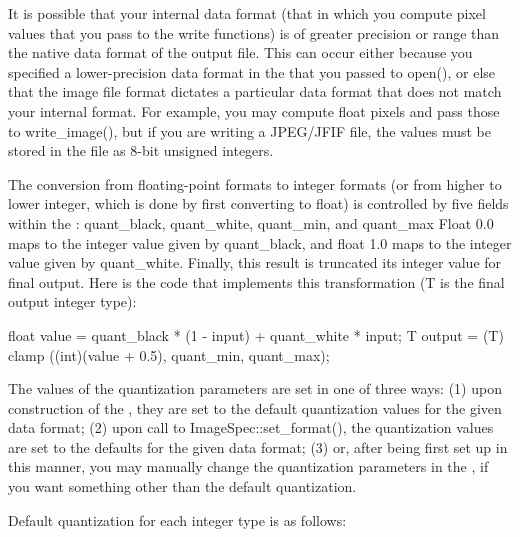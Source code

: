 It is possible that your internal data format (that in which you compute
pixel values that you pass to the {\cf write} functions) is of greater
precision or range than the native data format of the output file.  This
can occur either because you specified a lower-precision data format in
the \ImageSpec that you passed to {\cf open()}, or else that the
image file format dictates a particular data format that does not match
your internal format.  For example, you may compute {\cf float} pixels
and pass those to {\cf write_image()}, but if you are writing a
JPEG/JFIF file, the values must be stored in the file as 8-bit unsigned
integers.

The conversion from floating-point formats to integer formats (or from
higher to lower integer, which is done by first converting to float) is
controlled by five fields within the \ImageSpec: {\cf
  quant_black}, {\cf quant_white}, {\cf quant_min}, and {\cf quant_max}
Float 0.0 maps to the integer value given by {\cf quant_black}, and
float 1.0 maps to the integer value given by {\cf quant_white}. Finally,
this result is truncated its integer value for final output.  Here is
the code that implements this transformation ({\cf T} is the final
output integer type):

\begin{code}
        float value = quant_black * (1 - input) + quant_white * input;
        T output = (T) clamp ((int)(value + 0.5), quant_min, quant_max);
\end{code}

The values of the quantization parameters are set in one of three ways:
(1) upon construction of the \ImageSpec, they are set to the
default quantization values for the given data format; (2) upon call to
{\cf ImageSpec::set_format()}, the quantization values are set
to the defaults for the given data format; (3) or, after being first set
up in this manner, you may manually change the quantization parameters
in the \ImageSpec, if you want something other than the default
quantization.

\noindent Default quantization for each integer type is as follows:\\

